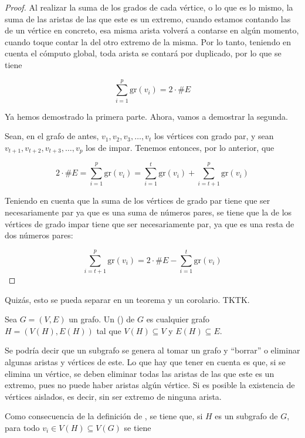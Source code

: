 \begin{proof}
  Al realizar la suma de los grados de cada vértice, o lo que es lo mismo,
  la suma de las aristas de las que este es un extremo, cuando estamos
  contando las de un vértice en concreto, esa misma arista volverá a
  contarse en algún momento, cuando toque contar la del otro extremo de la
  misma. Por lo tanto, teniendo en cuenta el cómputo global, toda arista se
  contará por duplicado, por lo que se tiene

  $$ \sum_{i=1}^p \text{gr}(v_i) = 2 \cdot \#E $$

  Ya hemos demostrado la primera parte. Ahora, vamos a demostrar la segunda.

  Sean, en el grafo de antes, $v_1, v_2, v_3, \ldots, v_t$ los vértices con
  grado par, y sean $v_{t+1}, v_{t+2}, v_{t+3}, \ldots, v_p$ los de impar.
  Tenemos entonces, por lo anterior, que

  $$ 2 \cdot \#E = \sum_{i=1}^p \text{gr}(v_i) = \sum_{i=1}^t \text{gr}(v_i)
  + \sum_{i=t+1}^p \text{gr}(v_i) $$

  Teniendo en cuenta que la suma de los vértices de grado par tiene que ser
  necesariamente par ya que es una suma de números pares, se tiene que la de
  los vértices de grado impar tiene que ser necesariamente par, ya que es
  una resta de dos números pares:

  $$ \sum_{i=t+1}^p \text{gr}(v_i) = 2 \cdot \#E - \sum_{i=1}^t
  \text{gr}(v_i) $$
\end{proof}

Quizás, esto se pueda separar en un teorema y un corolario. TKTK.

\begin{deffinition}[Subgrafo]
  Sea $G = (V, E)$ un grafo. Un  () de $G$ es
  cualquier grafo $H = (V(H), E(H))$ tal que $V(H) \subseteq V$ y $E(H)
  \subseteq E$.
\end{deffinition}

Se podría decir que un subgrafo se genera al tomar un grafo y ``borrar'' o
eliminar algunas aristas y vértices de este. Lo que hay que tener en cuenta
es que, si se elimina un vértice, se deben eliminar todas las aristas de las
que este es un extremo, pues no puede haber aristas algún vértice. Si es
posible la existencia de vértices aislados, es decir, sin ser extremo de
ninguna arista.

Como consecuencia de la definición de , se tiene que, si $H$ es
un subgrafo de $G$, para todo $v_i \in V(H) \subseteq V(G)$ se tiene

